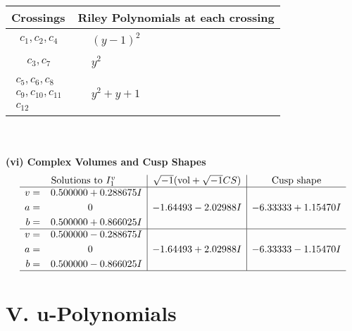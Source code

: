 \documentclass[1p]{elsarticle_modified}
\theoremstyle{definition}
\newcommand{\I}{\sqrt{-1}}
\begin{document}
\begin{tabular}{m{50pt}|m{274pt}}
Crossings & \hspace{64pt}Riley Polynomials at each crossing \\
\hline $$\begin{aligned}c_{1},c_{2},c_{4}\end{aligned}$$&$\begin{aligned}
&(y-1)^2
\end{aligned}$\\
\hline $$\begin{aligned}c_{3},c_{7}\end{aligned}$$&$\begin{aligned}
&y^2
\end{aligned}$\\
\hline $$\begin{aligned}c_{5},c_{6},c_{8}\\c_{9},c_{10},c_{11}\\c_{12}\end{aligned}$$&$\begin{aligned}
&y^2+y+1
\end{aligned}$\\
\hline
\end{tabular}\\~\\
\newpage\flushleft \textbf{(vi) Complex Volumes and Cusp Shapes}
$$\begin{array}{c|c|c}  
\text{Solutions to }I^v_{1}& \I (\text{vol} + \sqrt{-1}CS) & \text{Cusp shape}\\
 \hline 
\begin{aligned}
v &= \phantom{-}0.500000 + 0.288675 I \\
a &= \phantom{-0.000000 } 0 \\
b &= \phantom{-}0.500000 + 0.866025 I\end{aligned}
 & -1.64493 - 2.02988 I & -6.33333 + 1.15470 I \\ \hline\begin{aligned}
v &= \phantom{-}0.500000 - 0.288675 I \\
a &= \phantom{-0.000000 } 0 \\
b &= \phantom{-}0.500000 - 0.866025 I\end{aligned}
 & -1.64493 + 2.02988 I & -6.33333 - 1.15470 I\\
 \hline 
 \end{array}$$\newpage
\newpage\renewcommand{\arraystretch}{1}
\centering \section*{ V. u-Polynomials}
\end{document}
